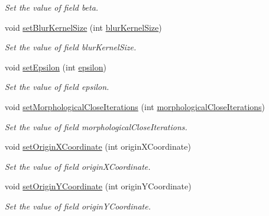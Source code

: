 \begin{DoxyCompactItemize}
\begin{DoxyCompactList}\small\item\em Set the value of field beta. \end{DoxyCompactList}\item 
void \hyperlink{classmultiscale_1_1analysis_1_1RegionDetector_a968d5ddbc060fa823e4c79c9dcfec300}{set\-Blur\-Kernel\-Size} (int \hyperlink{classmultiscale_1_1analysis_1_1RegionDetector_aae6ee0ec7f0a610dd8a906c1eb181bc7}{blur\-Kernel\-Size})
\begin{DoxyCompactList}\small\item\em Set the value of field blur\-Kernel\-Size. \end{DoxyCompactList}\item 
void \hyperlink{classmultiscale_1_1analysis_1_1RegionDetector_a069ed208d5ff16e6caa0deb4ff21858b}{set\-Epsilon} (int \hyperlink{classmultiscale_1_1analysis_1_1RegionDetector_acf21910fadd7c6ef2810743a78a0aeb9}{epsilon})
\begin{DoxyCompactList}\small\item\em Set the value of field epsilon. \end{DoxyCompactList}\item 
void \hyperlink{classmultiscale_1_1analysis_1_1RegionDetector_a5e096d2e4ff8dfe985869d6d0fcd74b8}{set\-Morphological\-Close\-Iterations} (int \hyperlink{classmultiscale_1_1analysis_1_1RegionDetector_a700a2f299d7c56fbd1fdbec68092f23a}{morphological\-Close\-Iterations})
\begin{DoxyCompactList}\small\item\em Set the value of field morphological\-Close\-Iterations. \end{DoxyCompactList}\item 
void \hyperlink{classmultiscale_1_1analysis_1_1RegionDetector_a9ace9f195f33aab9597f8a7c107c219d}{set\-Origin\-X\-Coordinate} (int origin\-X\-Coordinate)
\begin{DoxyCompactList}\small\item\em Set the value of field origin\-X\-Coordinate. \end{DoxyCompactList}\item 
void \hyperlink{classmultiscale_1_1analysis_1_1RegionDetector_a2e7fa31b11734cdd3f7fc7db55cedab8}{set\-Origin\-Y\-Coordinate} (int origin\-Y\-Coordinate)
\begin{DoxyCompactList}\small\item\em Set the value of field origin\-Y\-Coordinate. \end{DoxyCompactList}\item 

\end{DoxyCompactItemize}
